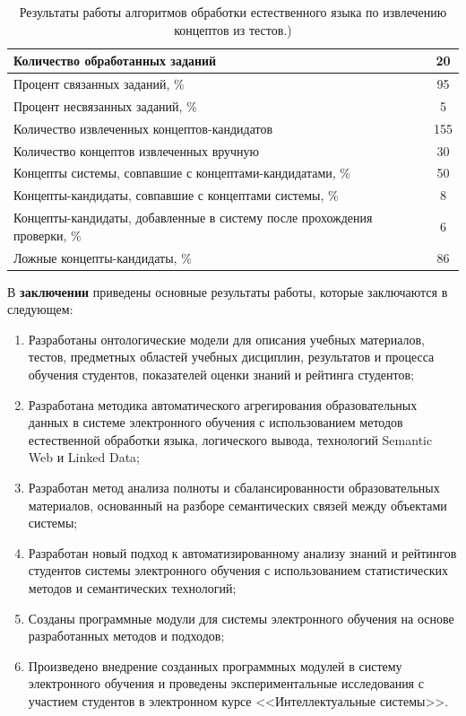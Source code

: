 \begin{table}[h!]
\centering
\caption{Результаты работы алгоритмов обработки естественного языка по извлечению концептов из тестов.)}
\label{table:2}
\begin{tabular}{ |p{12cm}|c|  }
\hline Количество обработанных заданий & 20 \\
\hline Процент связанных заданий, \% & 95 \\
\hline Процент несвязанных заданий, \% & 5 \\
\hline Количество извлеченных концептов-кандидатов & 155 \\
\hline Количество концептов извлеченных вручную & 30 \\
\hline Концепты системы, совпавшие с концептами-кандидатами, \% & 50 \\
\hline Концепты-кандидаты, совпавшие с концептами системы, \% & 8 \\
\hline Концепты-кандидаты, добавленные в систему после прохождения проверки, \%  & 6 \\
\hline Ложные концепты-кандидаты, \% & 86 \\
\hline
\end{tabular}
\end{table}  


В \textbf{заключении} приведены основные результаты работы, которые заключаются в следующем:
\begin{enumerate}
 \item Разработаны онтологические модели для описания учебных материалов, тестов, предметных областей учебных дисциплин, результатов и процесса обучения студентов, показателей оценки знаний и рейтинга студентов;
 \item Разработана методика автоматического агрегирования образовательных данных в системе электронного обучения с использованием методов естественной обработки языка, логического вывода, технологий Semantic Web и Linked Data;
 \item Разработан метод анализа полноты и сбалансированности образовательных материалов, основанный на разборе семантических связей между объектами системы;
  \item Разработан новый подход к автоматизированному анализу знаний и рейтингов студентов системы электронного обучения с использованием статистических методов и семантических технологий;
  \item Созданы программные модули для системы электронного обучения на основе разработанных методов и подходов;
  \item Произведено внедрение созданных программных модулей в систему электронного обучения и проведены экспериментальные исследования с участием студентов в электронном курсе <<Интеллектуальные системы>>.
  \end{enumerate}


\renewcommand{\refname}{Научные работы по теме диссертации}
\nocite{*}

